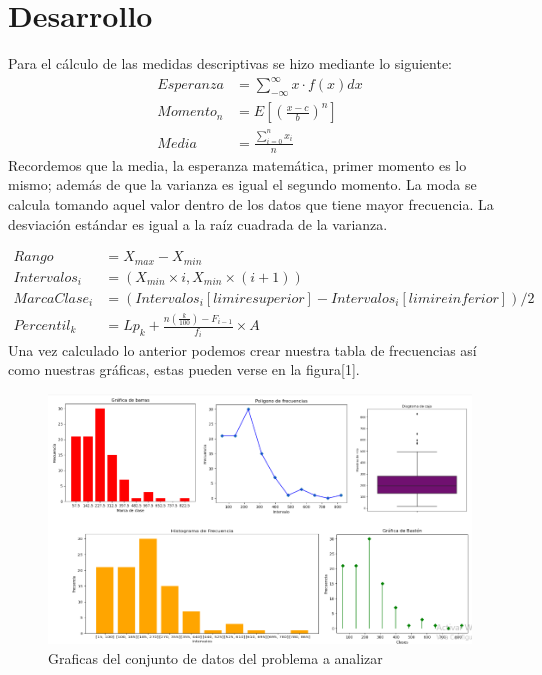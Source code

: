 \documentclass{report}
\begin{document}
\section{Desarrollo}
Para el cálculo de las medidas descriptivas se hizo mediante lo siguiente:
\begin{equation}
\begin{split}
Esperanza &= \sum_{-\infty}^{\infty} x \cdot f(x) dx\\
Momento_n &=E[(\frac{x-c}{b})^n]\\
Media &= \frac{\sum_{i=0}^{n}x_i}{n}
\end{split}
\end{equation}
Recordemos que la media, la esperanza matemática, primer momento es lo mismo; además de que la varianza es igual el segundo momento. La moda se calcula tomando aquel valor dentro de los datos que tiene mayor frecuencia. La desviación estándar es igual a la raíz cuadrada de la varianza.


\begin{equation}
\begin{split}
Rango & = X_{max}-X_{min} \\
Intervalos_i & = (X_{min}\times i,X_{min}\times (i+1))\\
MarcaClase_i &=(Intervalos_i[limire superior]-Intervalos_i[limire inferior])/2\\
Percentil_k &= Lp_k+\frac{n(\frac{k}{100})-F_{i-1}}{f_i}\times A
\end{split}
\end{equation}
Una vez calculado lo anterior podemos crear nuestra tabla de frecuencias así como nuestras gráficas, estas pueden verse en la figura[1].

\begin{figure}
\label{fig1}
\caption{Graficas del conjunto de datos del problema a analizar}
\includegraphics[width=1.1\textwidth]{images/1.png}
\end{figure}
\end{document}
